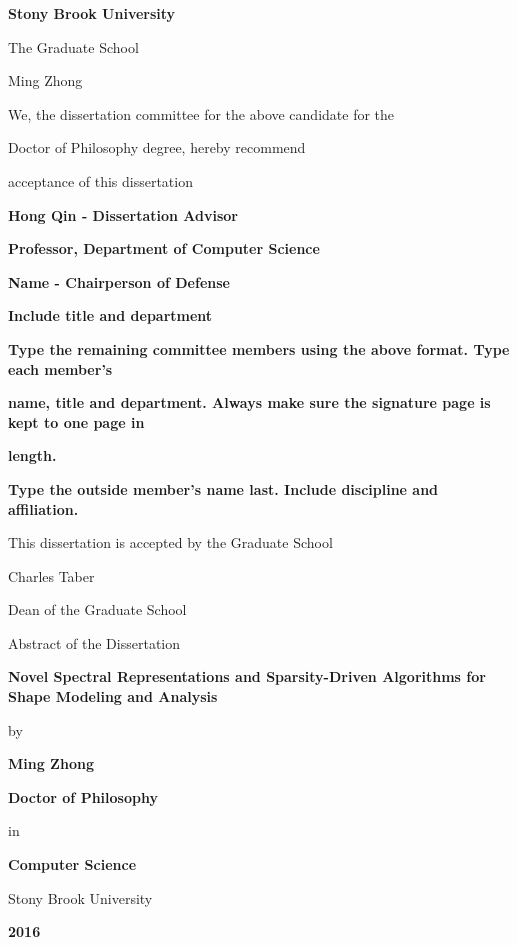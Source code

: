 \documentclass[12pt,letterpaper,twosided]{report}
\numberwithin{equation}{section}
\begin{document}
\centerline{\bf{Stony Brook University}}
\vspace*{1\baselineskip}
\centerline{The Graduate School}
\vspace*{2\baselineskip}
\centerline{Ming Zhong}
\vspace*{2\baselineskip}
\centerline{We, the dissertation committee for the above candidate for the}
\vspace*{1\baselineskip}
\centerline{Doctor of Philosophy degree, hereby recommend}
\vspace*{1\baselineskip}
\centerline{acceptance of this dissertation}
\vspace*{2\baselineskip}
\centerline{\bf{Hong Qin - Dissertation Advisor}}
\centerline{\bf{Professor, Department of Computer Science}}
\vspace*{2\baselineskip}
\centerline{\bf{Name - Chairperson of Defense}}
\centerline{\bf{Include title and department}}
\vspace*{2\baselineskip}
\centerline{\bf{Type the remaining committee members using the above format. Type each member's}}
\centerline{\bf{name, title and department. Always make sure the signature page is kept to one page in}}
\centerline{\bf{length.}}
\vspace*{1\baselineskip}
\centerline{\bf{Type the outside member's name last. Include discipline and affiliation.}}
\vspace*{2\baselineskip}
\centerline{This dissertation is accepted by the Graduate School}
\vspace*{3\baselineskip}
\centerline{Charles Taber}
\centerline{Dean of the Graduate School}

\afterpage{\null\newpage}

\centerline{Abstract of the Dissertation}
\vspace*{1\baselineskip}
\centerline{\bf{Novel Spectral Representations and Sparsity-Driven
Algorithms for Shape Modeling and Analysis}}
\vspace*{1\baselineskip}
\centerline{by}
\vspace*{1\baselineskip}
\centerline{\bf{Ming Zhong}}
\vspace*{1\baselineskip}
\centerline{\bf{Doctor of Philosophy}}
\vspace*{1\baselineskip}
\centerline{in}
\vspace*{1\baselineskip}
\centerline{\bf{Computer Science}}
\vspace*{1\baselineskip}
\centerline{Stony Brook University}
\vspace*{1\baselineskip}
\centerline{\bf{2016}}
\vspace*{2\baselineskip}
\end{document}
